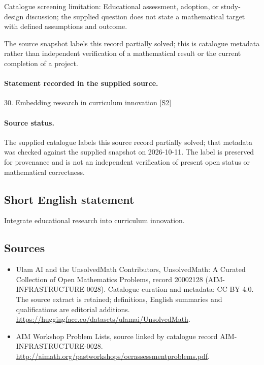 \documentclass[11pt]{article}
\begin{document}
Catalogue screening limitation: Educational assessment, adoption, or study-design discussion; the supplied question does not state a mathematical target with defined assumptions and outcome.

The source snapshot labels this record partially solved; this is catalogue metadata rather than independent verification of a mathematical result or the current completion of a project.
\paragraph{Statement recorded in the supplied source.}
30. Embedding research in curriculum innovation \href{http://aimath.org/pastworkshops/oerassessmentproblems.pdf}{[S2]}
\paragraph{Source status.}
The supplied catalogue labels this source record partially solved; that metadata was checked against the supplied snapshot on 2026-10-11. The label is preserved for provenance and is not an independent verification of present open status or mathematical correctness.
\subsection{Short English statement}
Integrate educational research into curriculum innovation.
\subsection{Sources}
\begin{itemize}
\item[S1] Ulam AI and the UnsolvedMath Contributors, UnsolvedMath: A Curated Collection of Open Mathematics Problems, record 20002128 (AIM-INFRASTRUCTURE-0028). Catalogue curation and metadata: CC BY 4.0. The source extract is retained; definitions, English summaries and qualifications are editorial additions.
\url{https://huggingface.co/datasets/ulamai/UnsolvedMath}.
\item[S2] AIM Workshop Problem Lists, source linked by catalogue record AIM-INFRASTRUCTURE-0028.
\url{http://aimath.org/pastworkshops/oerassessmentproblems.pdf}.
\end{itemize}
\end{document}
